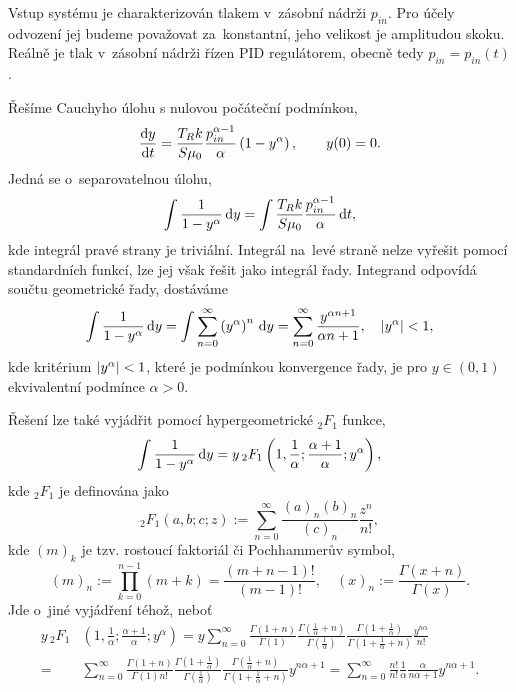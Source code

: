 Vstup systému je charakterizován tlakem v~zásobní nádrži $p_{in}$. Pro účely odvození jej budeme považovat za~konstantní, jeho velikost je amplitudou skoku. Reálně je tlak v~zásobní nádrži řízen PID regulátorem, obecně tedy $p_{in}=p_{in}(t)$.

Řešíme Cauchyho úlohu s nulovou počáteční podmínkou,
\begin{equation}\label{eq:general_cauchy_problem_alpha}
    \frac{\mathrm{d} y}{\mathrm{d} t}=\frac{T_R k}{S \mu_0}\frac{p_{in}^{\alpha-1}}{\alpha}\left(1-y^\alpha\right),\qquad y(0)=0.
\end{equation}
Jedná se o~separovatelnou úlohu,
\begin{equation}\label{eq:step_response_diff_eqn}
    \int\frac{1}{1-y^{\alpha}} \,\mathrm{d}{y} =\int\frac{T_R k}{S \mu_0}\frac{p_{in}^{\alpha-1}}{\alpha} \,\mathrm{d}{t},
\end{equation}
kde integrál pravé strany je triviální. Integrál na~levé straně nelze vyřešit pomocí standardních funkcí, lze jej však řešit jako integrál řady. Integrand odpovídá součtu geometrické řady, dostáváme
\begin{equation}\label{eq:general_cauchy_series_solution_positive}
\int \frac{1}{1-y^{\alpha}} \,\mathrm{d}{y}=\int \sum_{n=0}^{\infty}\left(y^{\alpha}\right)^n \,\mathrm{d}{y}=\sum_{n=0}^{\infty}\frac{y^{\alpha n+1}}{\alpha n+1},\quad \left\lvert y^{\alpha}\right\rvert<1,
\end{equation}
kde kritérium $\left\lvert y^{\alpha}\right\rvert<1$, které je podmínkou konvergence řady, je pro $y\in(0,1)$ ekvivalentní podmínce $\alpha>0$. 

Řešení lze také vyjádřit pomocí hypergeometrické ${}_{2}F_1$ funkce,
\begin{equation}
    \int \frac{1}{1-y^{\alpha}} \,\mathrm{d}{y}=y {\,}_2F_1\left(1,\frac{1}{\alpha};\frac{\alpha+1}{\alpha};y^{\alpha}\right),
\end{equation}
kde ${}_2F_1$ je definována jako
\begin{equation}
    {}_2F_1\left(a,b;c;z\right):=\sum_{n=0}^{\infty}\frac{\left(a\right)_{n}\left(b\right)_n}{\left(c\right)_n}\frac{z^n}{n!},
\end{equation}
kde $\left(m\right)_k$ je tzv. rostoucí faktoriál či Pochhammerův symbol,
\begin{equation}
    \left(m\right)_n:=\prod_{k=0}^{n-1}\left(m+k\right)=\frac{\left(m+n-1\right)!}{\left(m-1\right)!},\quad \left(x\right)_{n}:=\frac{\Gamma(x+n)}{\Gamma(x)}.
\end{equation}
Jde o~jiné vyjádření téhož, neboť
\begin{align}
    y {\,}_2F_1 & \left(1,\frac{1}{\alpha};\frac{\alpha+1}{\alpha};y^{\alpha}\right)
    =y\sum_{n=0}^{\infty}\frac{\Gamma(1+n)}{\Gamma(1)}\frac{\Gamma(\frac{1}{\alpha}+n)}{\Gamma(\frac{1}{\alpha})}\frac{\Gamma(1+\frac{1}{\alpha})}{\Gamma(1+\frac{1}{\alpha}+n)}\frac{y^{n\alpha}}{n!}\nonumber\\
    =&\sum_{n=0}^{\infty}\frac{\Gamma(1+n)}{\Gamma(1)n!}\frac{\Gamma(1+\frac{1}{\alpha})}{\Gamma(\frac{1}{\alpha})}\frac{\Gamma(\frac{1}{\alpha}+n)}{\Gamma(1+\frac{1}{\alpha}+n)} y^{n\alpha+1}
    =\sum_{n=0}^{\infty}\frac{n!}{n!}\frac{1}{\alpha}\frac{\alpha}{n\alpha +1}y^{n\alpha+1}.
\end{align}

